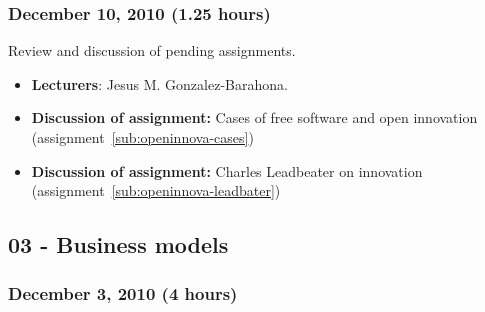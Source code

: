 \documentclass[a4paper]{article}
\begin{document}
\subsubsection{December 10, 2010 (1.25 hours)}

Review and discussion of pending assignments.

\begin{itemize}
 \item \textbf{Lecturers}: Jesus M. Gonzalez-Barahona.
\item \textbf{Discussion of assignment:} Cases of free software and open innovation (assignment~\ref{sub:openinnova-cases})
\item \textbf{Discussion of assignment:} Charles Leadbeater on innovation (assignment~\ref{sub:openinnova-leadbater})
\end{itemize}

\subsection{03 - Business models}

\subsubsection{December 3, 2010 (4 hours)}
\end{document}
